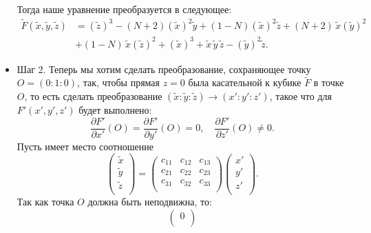 \documentclass[a4paper,12pt]{article}
\theoremstyle{definition}
\begin{document}
\begin{itemize}[leftmargin=1cm]
        Тогда наше уравнение преобразуется в следующее:  
        \begin{align*}
            \widetilde{F}(\widetilde{x}, \widetilde{y}, \widetilde{z}) &= 
         \left(\widetilde{z}\right)^3
         -(N + 2) \left(\widetilde{x}\right)^2 \widetilde{y} + (1 - N)
         \left(\widetilde{x}\right)^2 \widetilde{z} + (N + 2) \,
         \widetilde{x} \left(\widetilde{y}\right)^2 \\ 
         &+ (1 - N) \, \widetilde{x} \left(\widetilde{z}\right)^2 + 
         \left(\widetilde{x}\right)^3 + \widetilde{x} \,
         \widetilde{y} \, \widetilde{z} -
         \left(\widetilde{y}\right)^2 \widetilde{z}
        .\end{align*}
        

        \item Шаг 2. Теперь мы хотим сделать преобразование,
        сохраняющее точку \(O = (0 : 1 : 0)\), так, чтобы
        прямая \(z = 0\) была касательной к кубике \(\widetilde{F}\) в точке
        \(O\), то есть сделать преобразование \((\widetilde{x} :
        \widetilde{y} : \widetilde{z}) \to (x' : y' : z')\), такое что
        для \(F'(x', y', z')\) будет выполнено: 
         \[
        \frac{\partial F'}{\partial x'} (O) = \frac{\partial F'}{\partial y'}
        (O) = 0, \quad \frac{\partial F'}{\partial z'} (O) \ne 0
        .\]
        Пусть имеет место соотношение
        \[
        \begin{pmatrix}
            \widetilde{x} \\
            \widetilde{y} \\
            \widetilde{z} \\
        \end{pmatrix} 
        = 
        \begin{pmatrix}
            c_{11} & c_{12} & c_{13} \\
            c_{21} & c_{22} & c_{23} \\
            c_{31} & c_{32} & c_{33} \\
        \end{pmatrix}
        \begin{pmatrix}
            x' \\
            y' \\
            z' \\
        \end{pmatrix}
        .\] 
        Так как точка \(O\) должна быть неподвижна, то:
        \[
        \begin{pmatrix}
            0 \\

\end{pmatrix}\]
\end{itemize}
\end{document}
